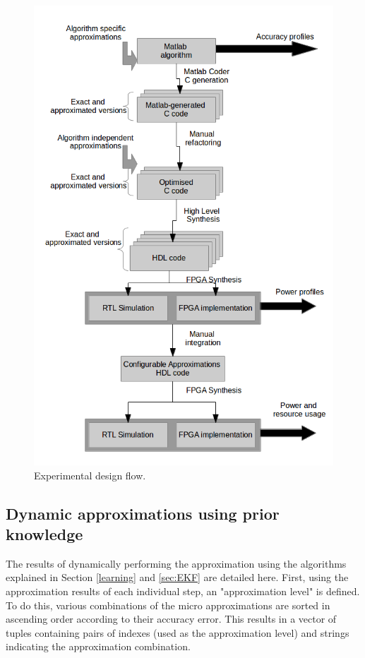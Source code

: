 \begin{figure}[tb]
  \centering
  \includegraphics[width=0.9\columnwidth]{img/experimental_flow.png}
  \caption{Experimental design flow.}
  \label{fig:experimental_flow}
\end{figure}


\subsection{Dynamic approximations using prior knowledge}
The results of dynamically performing the approximation using the algorithms explained in Section \ref{learning} and \ref{sec:EKF} are detailed here. First, using the approximation results of each individual step, an "approximation level" is defined. To do this, various combinations of the micro approximations are sorted in ascending order according to their accuracy error. This results in a vector of tuples containing pairs of indexes (used as the approximation level) and strings indicating the approximation combination. 

